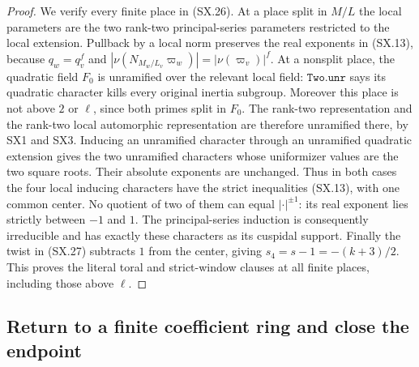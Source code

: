 \begin{proof}
We verify every finite place in (SX.26).  At a place split in
$M/L$ the local parameters are the two rank-two principal-series
parameters restricted to the local extension.  Pullback by a
local norm preserves the real exponents in (SX.13), because
$q_w=q_v^f$ and
$|\nu(N_{M_w/L_v}\varpi_w)|=|\nu(\varpi_v)|^f$.
At a nonsplit place, the quadratic field $F_0$ is unramified
over the relevant local field: $\texttt{Two.unr}$ says its
quadratic character kills every original inertia subgroup.
Moreover this place is not above $2$ or $\ell$, since both
primes split in $F_0$.  The rank-two representation and the
rank-two local automorphic representation are therefore
unramified there, by SX1 and SX3.  Inducing an unramified
character through an unramified quadratic extension gives
the two unramified characters whose uniformizer values are
the two square roots.  Their absolute exponents are unchanged.
Thus in both cases the four local inducing characters have
the strict inequalities (SX.13), with one common center.
No quotient of two of them can equal $|\cdot|^{\pm1}$:
its real exponent lies strictly between $-1$ and $1$.
The principal-series induction is consequently irreducible
and has exactly these characters as its cuspidal support.
Finally the twist in (SX.27) subtracts $1$ from the center,
giving $s_4=s-1=-(k+3)/2$.
This proves the literal toral and strict-window clauses at
all finite places, including those above $\ell$.
\end{proof}

\subsection{Return to a finite coefficient ring and close the endpoint}

